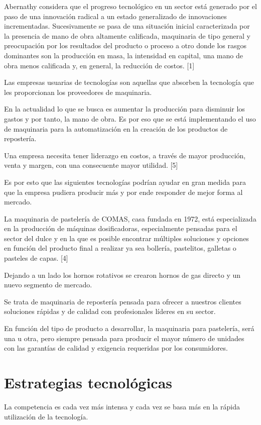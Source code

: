 \documentclass{bmcart}
\begin{document}
Abernathy considera que el progreso tecnológico en un sector está generado por el paso de una innovación radical a un estado generalizado de innovaciones incrementadas. Sucesivamente se pasa de una situación inicial caracterizada por la presencia de mano de obra altamente calificada, maquinaria de tipo general y preocupación por los resultados del producto o proceso a otro donde los rasgos dominantes son la producción en masa, la intensidad en capital, una mano de obra menos calificada y, en general, la reducción de costos. [1]



Las empresas usuarias de tecnologías son aquellas que absorben la tecnología que les proporcionan los proveedores de maquinaria.

En la actualidad lo que se busca es aumentar la producción para disminuir los gastos y por tanto, la mano de obra. Es por eso que se está implementando el uso de maquinaria para la automatización en la creación de los productos de repostería.

Una empresa necesita tener liderazgo en costos, a través de mayor producción, venta y margen, con una consecuente mayor utilidad. [5]

Es por esto que las siguientes tecnologías podrían ayudar en gran medida para que la empresa pudiera producir más y por ende responder de mejor forma al mercado.

La maquinaria de pastelería de COMAS, casa fundada en 1972, está especializada en la producción de máquinas dosificadoras, especialmente pensadas para el sector del dulce y en la que es posible encontrar múltiples soluciones y opciones en función del producto final a realizar ya sea bollería, pastelitos, galletas o pasteles de capas. [4]


Dejando a un lado los hornos rotativos se crearon hornos de gas directo y un nuevo segmento de mercado.

Se trata de maquinaria de repostería pensada para ofrecer a nuestros clientes soluciones rápidas y de calidad con profesionales líderes en su sector. 

En función del tipo de producto a desarrollar, la maquinaria para pastelería, será una u otra, pero siempre pensada para producir el mayor número de unidades con las garantías de calidad y exigencia requeridas por los consumidores.


\section{Estrategias tecnológicas}
La competencia es cada vez más intensa y cada vez se basa más en la rápida utilización de la tecnología.
\end{document}
